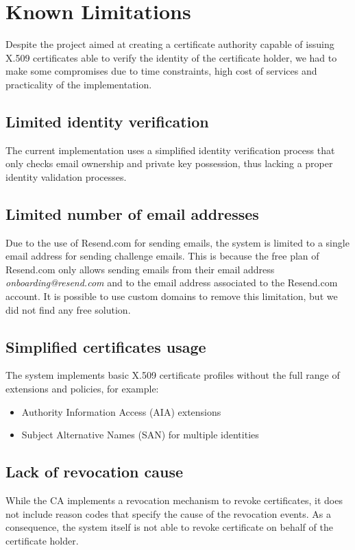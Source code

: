 \chapter{Known Limitations}

Despite the project aimed at creating a certificate authority capable of issuing X.509 certificates 
able to verify the identity of the certificate holder, we had to make some compromises due to time
constraints, high cost of services and practicality of the implementation.

\section{Limited identity verification}
The current implementation uses a simplified identity verification process
that only checks email ownership and private key possession, thus lacking a proper identity validation
processes.

\section{Limited number of email addresses}
Due to the use of Resend.com for sending emails, the system is limited to a single email address
for sending challenge emails. This is because the free plan of Resend.com only allows sending emails
from their email address \textit{onboarding@resend.com} and to the email address associated to the Resend.com account.
It is possible to use custom domains to remove this limitation, but we did not find any free solution.

\section{Simplified certificates usage}

The system implements basic X.509 certificate profiles without the full range 
of extensions and policies, for example:
\begin{itemize}
    \item Authority Information Access (AIA) extensions
    \item Subject Alternative Names (SAN) for multiple identities
\end{itemize}

\section{Lack of revocation cause}

While the CA implements a revocation mechanism to revoke certificates, it does not include
reason codes that specify the cause of the revocation events. As a consequence, the system itself
is not able to revoke certificate on behalf of the certificate holder.


